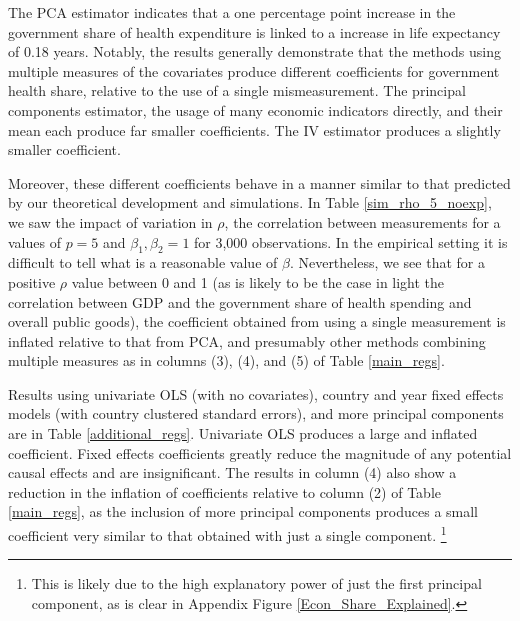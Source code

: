 \documentclass[10pt]{article}
\begin{document}
        

        The PCA estimator indicates that a one percentage point increase in the government share of health expenditure is linked to a increase in life expectancy of 0.18 years. Notably, the results generally demonstrate that the methods using multiple measures of the covariates produce different coefficients for government health share, relative to the use of a single mismeasurement. The principal components estimator, the usage of many economic indicators directly, and their mean each produce far smaller coefficients. The IV estimator produces a slightly smaller coefficient.

        Moreover, these different coefficients behave in a manner similar to that predicted by our theoretical development and simulations. In Table \ref{sim_rho_5_noexp}, we saw the impact of variation in $\rho$, the correlation between measurements for a values of $p = 5$ and $\beta_1, \beta_2 = 1$ for 3,000 observations. In the empirical setting it is difficult to tell what is a reasonable value of $\beta$. Nevertheless, we see that for a positive $\rho$ value between 0 and 1 (as is likely to be the case in light the correlation between GDP and the government share of health spending and overall public goods), the coefficient obtained from using a single measurement is inflated relative to that from PCA, and presumably other methods combining multiple measures as in columns (3), (4), and (5) of Table \ref{main_regs}.


        Results using univariate OLS (with no covariates), country and year fixed effects models (with country clustered standard errors), and more principal components are in Table \ref{additional_regs}. Univariate OLS produces a large and inflated coefficient. Fixed effects coefficients greatly reduce the magnitude of any potential causal effects and are insignificant. The results in column (4) also show a reduction in the inflation of coefficients relative to column (2) of Table \ref{main_regs}, as the inclusion of more principal components produces a small coefficient very similar to that obtained with just a single component. \footnote{This is likely due to the high explanatory power of just the first principal component, as is clear in Appendix Figure \ref{Econ_Share_Explained}.}

        
\end{document}
